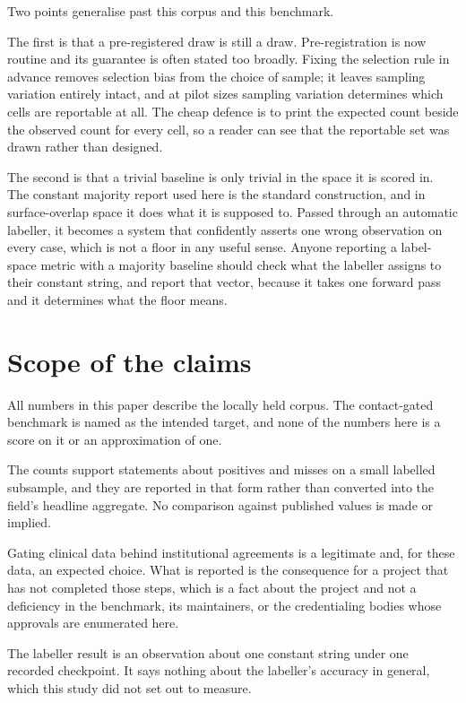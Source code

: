 Two points generalise past this corpus and this benchmark.

The first is that a pre-registered draw is still a draw. Pre-registration is
now routine and its guarantee is often stated too broadly. Fixing the
selection rule in advance removes selection bias from the choice of sample; it
leaves sampling variation entirely intact, and at pilot sizes sampling
variation determines which cells are reportable at all. The cheap defence is
to print the expected count beside the observed count for every cell, so a
reader can see that the reportable set was drawn rather than designed.

The second is that a trivial baseline is only trivial in the space it is
scored in. The constant majority report used here is the standard
construction, and in surface-overlap space it does what it is supposed to.
Passed through an automatic labeller, it becomes a system that confidently
asserts one wrong observation on every case, which is not a floor in any
useful sense. Anyone reporting a label-space metric with a majority baseline
should check what the labeller assigns to their constant string, and report
that vector, because it takes one forward pass and it determines what the
floor means.

\section{Scope of the claims}

All numbers in this paper describe the locally held corpus. The contact-gated
benchmark is named as the intended target, and none of the numbers here is a
score on it or an approximation of one.

The counts support statements about positives and misses on a small labelled
subsample, and they are reported in that form rather than converted into the
field's headline aggregate. No comparison against published values is made or
implied.

Gating clinical data behind institutional agreements is a legitimate and, for
these data, an expected choice. What is reported is the consequence for a
project that has not completed those steps, which is a fact about the project
and not a deficiency in the benchmark, its maintainers, or the credentialing
bodies whose approvals are enumerated here.

The labeller result is an observation about one constant string under one
recorded checkpoint. It says nothing about the labeller's accuracy in general,
which this study did not set out to measure.


